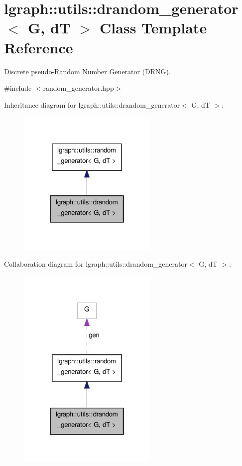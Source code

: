 \hypertarget{classlgraph_1_1utils_1_1drandom__generator}{\section{lgraph\-:\-:utils\-:\-:drandom\-\_\-generator$<$ G, d\-T $>$ Class Template Reference}
\label{classlgraph_1_1utils_1_1drandom__generator}
}


Discrete pseudo-\/\-Random Number Generator (D\-R\-N\-G).  




{\ttfamily \#include $<$random\-\_\-generator.\-hpp$>$}



Inheritance diagram for lgraph\-:\-:utils\-:\-:drandom\-\_\-generator$<$ G, d\-T $>$\-:\nopagebreak
\begin{figure}[H]
\begin{center}
\leavevmode
\includegraphics[width=190pt]{classlgraph_1_1utils_1_1drandom__generator__inherit__graph}
\end{center}
\end{figure}


Collaboration diagram for lgraph\-:\-:utils\-:\-:drandom\-\_\-generator$<$ G, d\-T $>$\-:\nopagebreak
\begin{figure}[H]
\begin{center}
\leavevmode
\includegraphics[width=190pt]{classlgraph_1_1utils_1_1drandom__generator__coll__graph}
\end{center}
\end{figure}
